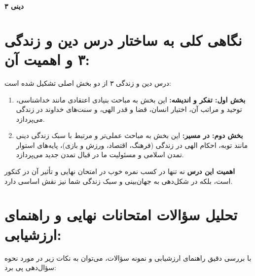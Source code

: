 \documentclass[11pt,a4paper]{article}
\begin{document}
\begin{center}
    \textbf{\Huge دینی ۳}
\end{center}

\section*{نگاهی کلی به ساختار درس دین و زندگی ۳ و اهمیت آن:}

درس دین و زندگی ۳ از دو بخش اصلی تشکیل شده است:

\begin{enumerate}
    \item \textbf{بخش اول: تفکر و اندیشه:} این بخش به مباحث بنیادی اعتقادی مانند خداشناسی، توحید و مراتب آن، اختیار انسان، قضا و قدر الهی، و سنت‌های خداوند در زندگی می‌پردازد.
    \item \textbf{بخش دوم: در مسیر:} این بخش به مباحث عملی‌تر و مرتبط با سبک زندگی دینی مانند توبه، احکام الهی در زندگی (فرهنگ، اقتصاد، ورزش و بازی)، پایه‌های استوار تمدن اسلامی و مسئولیت ما در قبال تمدن جدید می‌پردازد.
\end{enumerate}

\textbf{اهمیت این درس} نه تنها در کسب نمره خوب در امتحان نهایی و تأثیر آن در کنکور است، بلکه در شکل‌دهی به جهان‌بینی و سبک زندگی شما نیز نقش اساسی دارد.

\section*{تحلیل سؤالات امتحانات نهایی و راهنمای ارزشیابی:}

با بررسی دقیق راهنمای ارزشیابی و نمونه سؤالات، می‌توان به نکات زیر در مورد نحوه سؤال‌دهی پی برد:
\end{document}

